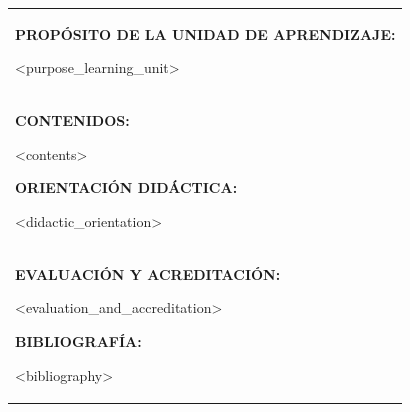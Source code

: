 \documentclass[10pt]{article}
\begin{document}
  \begin{longtable}{|p{}|}
    \hline
    \textbf{PROPÓSITO DE LA UNIDAD DE APRENDIZAJE:}

    <purpose_learning_unit> \\

    \textbf{CONTENIDOS:}
    \begin{enumerate}[I]
    \setlength{\itemsep}{0pt}
    \setlength{\parskip}{0pt}
    <contents>
    \end{enumerate}

    \textbf{ORIENTACIÓN DIDÁCTICA:}

    <didactic_orientation> \\ 

    \textbf{EVALUACIÓN Y ACREDITACIÓN:}
    \begin{itemize}[leftmargin=*]
    \setlength{\itemsep}{0pt}
    \setlength{\parskip}{0pt}
    <evaluation_and_accreditation>
    \end{itemize}
    \textbf{BIBLIOGRAFÍA:}
    \begin{itemize}[leftmargin=*]
    \setlength{\itemsep}{0pt}
    \setlength{\parskip}{0pt}
    <bibliography> 
    \end{itemize}
    \\ \hline
  \end{longtable}

\end{document}
